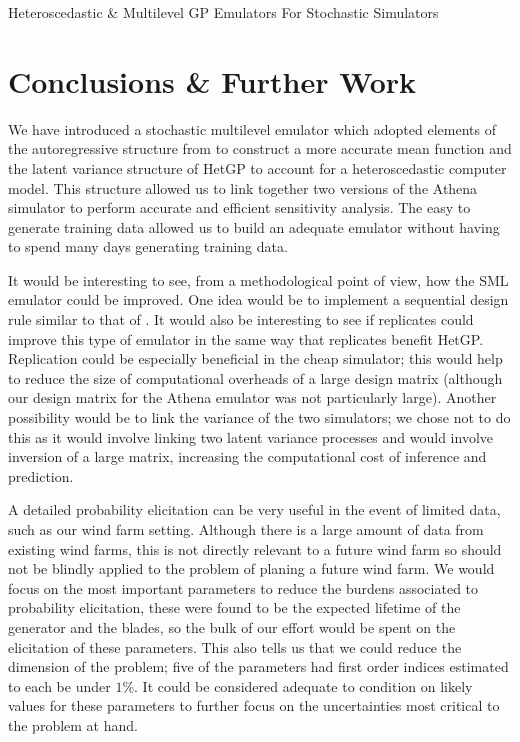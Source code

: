 \begin{chapter}{Heteroscedastic \& Multilevel GP Emulators For Stochastic Simulators\label{Ch:Hetsml}}
\section{Conclusions \& Further Work}
We have introduced a stochastic multilevel emulator which adopted elements of the autoregressive structure from \cite{Kennedy2000} to construct a more accurate mean function and the latent variance structure of HetGP to account for a heteroscedastic computer model. This structure allowed us to link together two versions of the Athena simulator to perform accurate and efficient sensitivity analysis. The easy to generate training data allowed us to build an adequate emulator without having to spend many days generating training data.

It would be interesting to see, from a methodological point of view, how the SML emulator could be improved. One idea would be to implement a sequential design rule similar to that of \citet{Gratiet2015}. It would also be interesting to see if replicates could improve this type of emulator in the same way that replicates benefit HetGP. Replication could be especially beneficial in the cheap simulator; this would help to reduce the size of computational overheads of a large design matrix (although our design matrix for the Athena emulator was not particularly large). Another possibility would be to link the variance of the two simulators; we chose not to do this as it would involve linking two latent variance processes and would involve inversion of a large matrix, increasing the computational cost of inference and prediction.

A detailed probability elicitation can be very useful in the event of limited data, such as our wind farm setting. Although there is a large amount of data from existing wind farms, this is not directly relevant to a future wind farm so should not be blindly applied to the problem of planing a future wind farm. We would focus on the most important parameters to reduce the burdens associated to probability elicitation, these were found to be the expected lifetime of the generator and the blades, so the bulk of our effort would be spent on the elicitation of these parameters. This also tells us that we could reduce the dimension of the problem; five of the parameters had first order indices estimated to each be under $1\%$. It could be considered adequate to condition on likely values for these parameters to further focus on the uncertainties most critical to the problem at hand.


\end{chapter}
